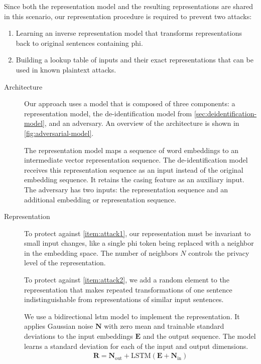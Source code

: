 %
Since both the representation model and the resulting representations are shared in this scenario, our representation procedure is required to prevent two attacks:
%
\begin{enumerate}[label=A\arabic*.,ref=A\arabic*]
    \item Learning an inverse representation model that transforms representations back to original sentences containing \ac{phi}.\label{item:attack1}
    \item Building a lookup table of inputs and their exact representations that can be used in known plaintext attacks.\label{item:attack2}
\end{enumerate}

\begin{description}
    \item[Architecture]
    Our approach uses a model that is composed of three components: a representation model, the de-identification model from \cref{sec:deidentification-model}, and an adversary.
    An overview of the architecture is shown in \cref{fig:adversarial-model}.
    
    The representation model maps a sequence of word embeddings to an intermediate vector representation sequence.
    The de-identification model receives this representation sequence as an input instead of the original embedding sequence.
    It retains the casing feature as an auxiliary input.
    The adversary has two inputs: the representation sequence and an additional embedding or representation sequence.
    
    \item[Representation]
    To protect against \ref{item:attack1}, our representation must be invariant to small input changes, like a single \ac{phi} token being replaced with a neighbor in the embedding space.
    The number of neighbors $N$ controls the privacy level of the representation.
    
    To protect against \ref{item:attack2}, we add a random element to the representation that makes repeated transformations of one sentence indistinguishable from representations of similar input sentences.
    
    We use a bidirectional \ac{lstm} model to implement the representation.
    It applies Gaussian noise $\bm{N}$ with zero mean and trainable standard deviations to the input embeddings $\bm{E}$ and the output sequence.
    The model learns a standard deviation for each of the input and output dimensions.
    \begin{align}
    \bm{R} = \bm{N}_{\text{out}} + \text{LSTM}(\bm{E} + \bm{N}_{\text{in}})
    \end{align}
    

\end{description}
